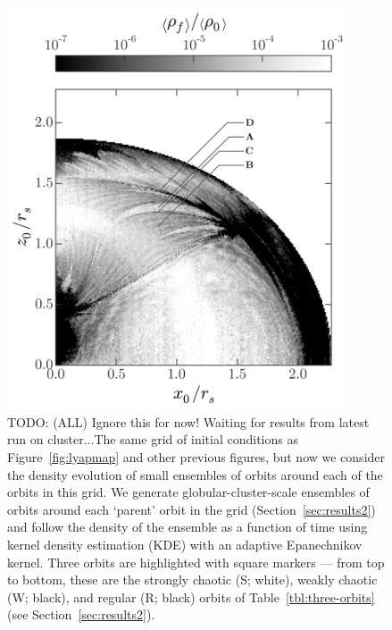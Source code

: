 \documentclass[letterpaper,12pt,preprint]{aastex}
\newcommand{\todo}[2]{{\color{red} TODO: (\MakeUppercase{#1}) #2}}
\begin{document}
\clearpage
\begin{figure}[p]
\begin{center}
\includegraphics[width=0.9\textwidth, trim={0 1cm 0 0}]{figures/ensemble-map.png}
\caption{\todo{all}{Ignore this for now! Waiting for results from latest run on cluster...}The same grid of initial conditions as Figure~\ref{fig:lyapmap} and other previous figures, but now we consider the density evolution of small ensembles of orbits around each of the orbits in this grid. We generate globular-cluster-scale ensembles of orbits around each `parent' orbit in the grid (Section~\ref{sec:results2}) and follow the density of the ensemble as a function of time using kernel density estimation (KDE) with an adaptive Epanechnikov kernel. Three orbits are highlighted with square markers --- from top to bottom, these are the strongly chaotic (S; white), weakly chaotic (W; black), and regular (R; black) orbits of Table~\ref{tbl:three-orbits} (see Section~\ref{sec:results2}).} 
\label{fig:ensemblemap-meandensity}
\end{center}
\end{figure}
\end{document}
